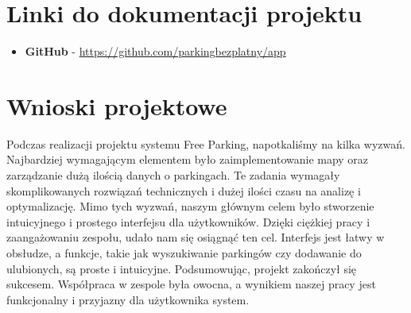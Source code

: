 \documentclass{article}
\begin{document}
    

    \section{Linki do dokumentacji projektu}
    \begin{itemize}
        \item \textbf{GitHub} - \href{https://github.com/parkingbezplatny/app}{https://github.com/parkingbezplatny/app}
    \end{itemize}
    \section{Wnioski projektowe}
    Podczas realizacji projektu systemu Free Parking, napotkaliśmy na kilka wyzwań. Najbardziej wymagającym elementem było zaimplementowanie mapy oraz zarządzanie dużą ilością danych o parkingach. Te zadania wymagały skomplikowanych rozwiązań technicznych i dużej ilości czasu na analizę i optymalizację.
Mimo tych wyzwań, naszym głównym celem było stworzenie intuicyjnego i prostego interfejsu dla użytkowników. Dzięki ciężkiej pracy i zaangażowaniu zespołu, udało nam się osiągnąć ten cel. Interfejs jest łatwy w obsłudze, a funkcje, takie jak wyszukiwanie parkingów czy dodawanie do ulubionych, są proste i intuicyjne.
Podsumowując, projekt zakończył się sukcesem. Współpraca w zespole była owocna, a wynikiem naszej pracy jest funkcjonalny i przyjazny dla użytkownika system.
\end{document}
